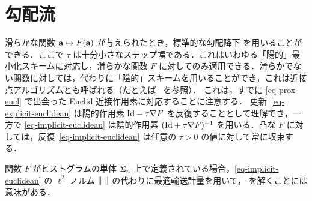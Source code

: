 \section{勾配流}
\label{sec-grad-flows}

滑らかな関数 $\mathrm{\textbf{a}} \mapsto F(\mathrm{\textbf{a}})$ が与えられたとき，標準的な勾配降下
を用いることができる．ここで $\tau$ は十分小さなステップ幅である．これはいわゆる「陽的」最小化スキームに対応し，滑らかな関数 $F$ に対してのみ適用できる．滑らかでない関数に対しては，代わりに「陰的」スキームを用いることができ，これは近接点アルゴリズムとも呼ばれる（たとえば~\citet{BauschkeCombettes11} を参照）．
これは，すでに \eqref{eq-prox-eucl} で出会った Euclid 近接作用素に対応することに注意する．
%
更新~\eqref{eq-explicit-euclidean} は陽的作用素 $\mathrm{Id}-\tau\nabla F$ を反復することとして理解でき，一方で \eqref{eq-implicit-euclidean} は陰的作用素 $(\mathrm{Id}+\tau\nabla F)^{-1}$ を用いる．凸な $F$ に対しては，反復~\eqref{eq-implicit-euclidean} は任意の $\tau>0$ の値に対して常に収束する．

関数 $F$ がヒストグラムの単体 $\Sigma_n$ 上で定義されている場合，\eqref{eq-implicit-euclidean} の $\ell^2$ ノルム $\left\| \cdot \right\|$ の代わりに最適輸送計量を用いて，
を解くことには意味がある．

